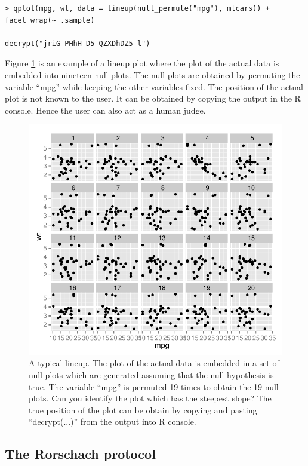 \documentclass[article]{jss}
\begin{document}
\begin{verbatim}
> qplot(mpg, wt, data = lineup(null_permute("mpg"), mtcars)) + facet_wrap(~ .sample)

decrypt("jriG PHhH D5 QZXDhDZ5 l")
\end{verbatim}

Figure \ref{lineup-ex} is an example of a lineup plot where the plot of the actual data is embedded into nineteen null plots. The null plots are obtained by permuting the variable ``mpg'' while keeping the other variables fixed. The position of the actual plot is not known to the user. It can be obtained by copying the output in the R console. Hence the user can also act as a human judge. 

\begin{figure}[hbtp]
\begin{center}
\includegraphics[scale=1]{nullabor-lineup.pdf}
\caption{A typical lineup. The plot of the actual data is embedded in a set of null plots which are generated assuming that the null hypothesis is true. The variable ``mpg'' is permuted 19 times to obtain the 19 null plots. Can you identify the plot which has the steepest slope? The true position of the plot can be obtain by copying and pasting ``decrypt(...)'' from the output into R console.}
\label{lineup-ex}
\end{center}
\end{figure}

\subsection{The Rorschach protocol}\label{the-rorschach-protocol}
\end{document}
